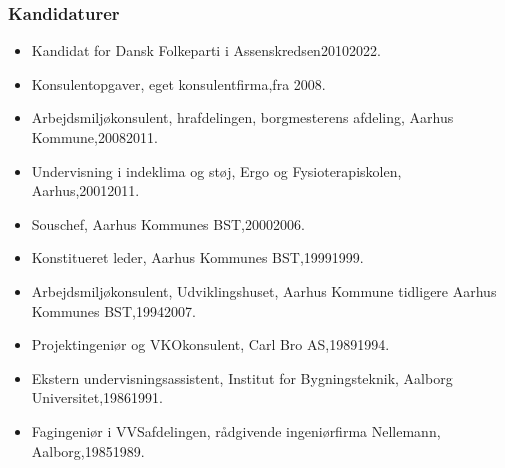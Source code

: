 \documentclass[11pt, a4paper]{awesome-cv}
\begin{document}
\begin{cvletter}
\subsubsection*{Kandidaturer}
\begin{itemize}
\item Kandidat for Dansk Folkeparti i Assenskredsen20102022.
\end{itemize}
\begin{itemize}
\item Konsulentopgaver, eget konsulentfirma,fra 2008.
\item Arbejdsmiljøkonsulent, hrafdelingen, borgmesterens afdeling, Aarhus Kommune,20082011.
\item Undervisning i indeklima og støj, Ergo og Fysioterapiskolen, Aarhus,20012011.
\item Souschef, Aarhus Kommunes BST,20002006.
\item Konstitueret leder, Aarhus Kommunes BST,19991999.
\item Arbejdsmiljøkonsulent, Udviklingshuset, Aarhus Kommune tidligere Aarhus Kommunes BST,19942007.
\item Projektingeniør og VKOkonsulent, Carl Bro AS,19891994.
\item Ekstern undervisningsassistent, Institut for Bygningsteknik, Aalborg Universitet,19861991.
\item Fagingeniør i VVSafdelingen, rådgivende ingeniørfirma Nellemann, Aalborg,19851989.
\end{itemize}
\end{cvletter}
\end{document}
